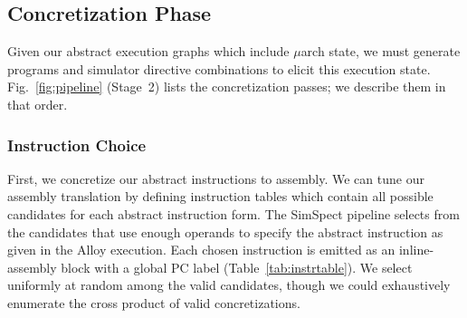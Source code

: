 \subsection{Concretization Phase}
Given our abstract execution graphs which include $\mu$arch state, we must generate programs and simulator directive combinations to elicit this execution state. Fig.~\ref{fig:pipeline} (Stage~2) lists the concretization passes; we describe them in that order.

\subsubsection{Instruction Choice}
First, we concretize our abstract instructions to assembly. We can tune our assembly translation by defining instruction tables which contain all possible candidates for each abstract instruction form. The SimSpect pipeline selects from the candidates that use enough operands to specify the abstract instruction as given in the Alloy execution. Each chosen instruction is emitted as an inline-assembly block with a global PC label
\notebr
{}
\notebr
(Table~\ref{tab:instrtable}).
We select uniformly at random among the valid candidates, though we could exhaustively enumerate the cross product of valid concretizations.

